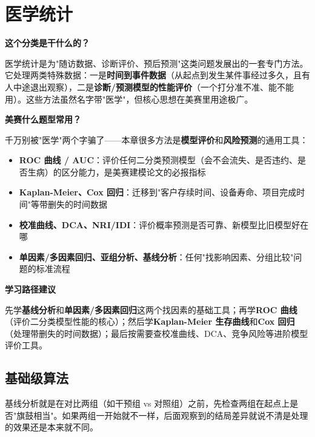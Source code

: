 ﻿%
\chapter{医学统计}

\begin{chapteroverview}
\textbf{这个分类是干什么的？}

医学统计是为"随访数据、诊断评价、预后预测"这类问题发展出的一套专门方法。它处理两类特殊数据：一是\textbf{时间到事件数据}（从起点到发生某件事经过多久，且有人中途退出观察），二是\textbf{诊断/预测模型的性能评价}（一个打分准不准、能不能用）。这些方法虽然名字带"医学"，但核心思想在美赛里用途极广。

\textbf{美赛什么题型常用？}

千万别被"医学"两个字骗了——本章很多方法是\textbf{模型评价}和\textbf{风险预测}的通用工具：
\begin{itemize}
    \item \textbf{ROC 曲线 / AUC}：评价任何二分类预测模型（会不会流失、是否违约、是否生病）的区分能力，是美赛建模论文的必报指标
    \item \textbf{Kaplan-Meier、Cox 回归}：迁移到"客户存续时间、设备寿命、项目完成时间"等带删失的时间数据
    \item \textbf{校准曲线、DCA、NRI/IDI}：评价概率预测是否可靠、新模型比旧模型好在哪
    \item \textbf{单因素/多因素回归、亚组分析、基线分析}：任何"找影响因素、分组比较"问题的标准流程
\end{itemize}

\textbf{学习路径建议}

先学\textbf{基线分析}和\textbf{单因素/多因素回归}这两个找因素的基础工具；再学\textbf{ROC 曲线}（评价二分类模型性能的核心）；然后学\textbf{Kaplan-Meier 生存曲线}和\textbf{Cox 回归}（处理带删失的时间数据）；最后按需要查校准曲线、DCA、竞争风险等进阶模型评价工具。
\end{chapteroverview}

\section{基础级算法}


\begin{algointro}
基线分析就是在对比两组（如干预组 vs 对照组）之前，先检查两组在起点上是否"旗鼓相当"。如果两组一开始就不一样，后面观察到的结局差异就说不清是处理的效果还是本来就不同。
\end{algointro}

